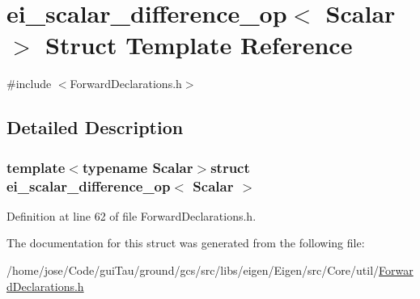 \hypertarget{structei__scalar__difference__op}{\section{ei\-\_\-scalar\-\_\-difference\-\_\-op$<$ Scalar $>$ Struct Template Reference}
\label{structei__scalar__difference__op}
}


{\ttfamily \#include $<$Forward\-Declarations.\-h$>$}



\subsection{Detailed Description}
\subsubsection*{template$<$typename Scalar$>$struct ei\-\_\-scalar\-\_\-difference\-\_\-op$<$ Scalar $>$}



Definition at line 62 of file Forward\-Declarations.\-h.



The documentation for this struct was generated from the following file\-:\begin{DoxyCompactItemize}
\item 
/home/jose/\-Code/gui\-Tau/ground/gcs/src/libs/eigen/\-Eigen/src/\-Core/util/\hyperlink{_forward_declarations_8h}{Forward\-Declarations.\-h}\end{DoxyCompactItemize}
